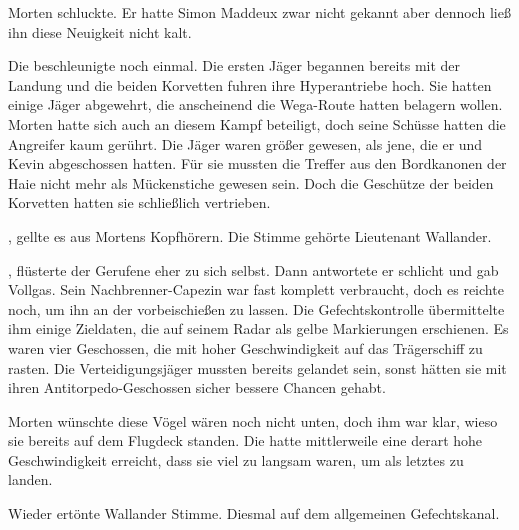 \par

Morten schluckte. Er hatte Simon Maddeux zwar nicht gekannt aber dennoch ließ ihn diese Neuigkeit nicht kalt.

\par

Die  beschleunigte noch einmal. Die ersten Jäger begannen bereits mit der Landung und die beiden Korvetten fuhren ihre Hyperantriebe hoch. Sie hatten einige Jäger abgewehrt, die anscheinend die Wega-Route hatten belagern wollen. Morten hatte sich auch an diesem Kampf beteiligt, doch seine Schüsse hatten die Angreifer kaum gerührt. Die Jäger waren größer gewesen, als jene, die er und Kevin abgeschossen hatten. Für sie mussten die Treffer aus den Bordkanonen der Haie nicht mehr als Mückenstiche gewesen sein. Doch die Geschütze der beiden Korvetten hatten sie schließlich vertrieben.

\par

, gellte es aus Mortens Kopfhörern. Die Stimme gehörte Lieutenant Wallander. 

\par

, flüsterte der Gerufene eher zu sich selbst. Dann antwortete er schlicht  und gab Vollgas. Sein Nachbrenner-Capezin war fast komplett verbraucht, doch es reichte noch, um ihn an der  vorbeischießen zu lassen. Die Gefechtskontrolle übermittelte ihm einige Zieldaten, die auf seinem Radar als gelbe Markierungen erschienen. Es waren vier Geschossen, die mit hoher Geschwindigkeit auf das Trägerschiff zu rasten. Die Verteidigungsjäger mussten bereits gelandet sein, sonst hätten sie mit ihren Antitorpedo-Geschossen sicher bessere Chancen gehabt.

\par

Morten wünschte diese Vögel wären noch nicht unten, doch ihm war klar, wieso sie bereits auf dem Flugdeck standen. Die  hatte mittlerweile eine derart hohe Geschwindigkeit erreicht, dass sie viel zu langsam waren, um als letztes zu landen.

\par

Wieder ertönte Wallander Stimme. Diesmal auf dem allgemeinen Gefechtskanal. 

